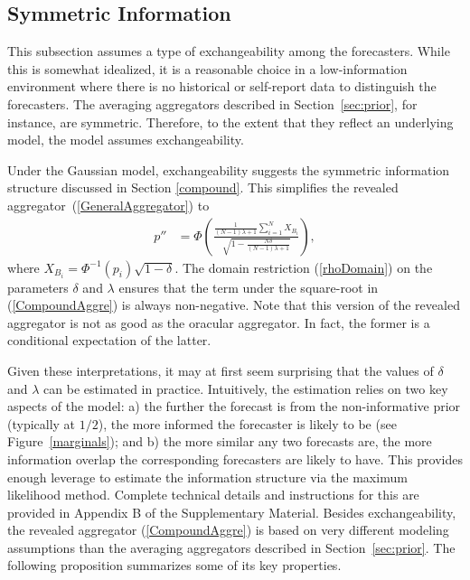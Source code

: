\documentclass[12pt]{article}
\theoremstyle{definition}
\theoremstyle{definition}
\begin{document}
\subsection{Symmetric Information}
\label{compound2}
This subsection assumes a type of exchangeability among the forecasters.
While this is somewhat idealized, it is a reasonable choice in a
low-information environment where there is no historical or
self-report data to distinguish the forecasters.  The averaging
aggregators described in Section~\ref{sec:prior}, for instance, are
symmetric. Therefore, to the extent that they reflect an underlying
model, the model assumes exchangeability. 

Under the Gaussian model, exchangeability suggests the
symmetric information structure discussed in Section \ref{compound}. This simplifies the revealed aggregator~(\ref{GeneralAggregator})  to
\begin{align}
p''
  &=\Phi\left(\frac{\frac{1}{(N-1)\lambda +1} 
  \sum_{i=1}^N X_{B_i} }{\sqrt{1- \frac{N\delta}{(N-1)\lambda +1} }}  
  \right), \label{CompoundAggre}
\end{align}
 where $X_{B_i} =
\Phi^{-1}(p_i)\sqrt{1-\delta}$. 
The domain restriction (\ref{rhoDomain}) on the parameters $\delta$ and $\lambda$ ensures that the term under
the square-root in (\ref{CompoundAggre}) is always non-negative. Note that this version of the revealed aggregator is not as good as the oracular
aggregator. In fact, the former is a conditional expectation of the latter.

Given these interpretations, it may at first seem surprising that the
values of $\delta$ and $\lambda$ can be estimated in practice.
Intuitively, the estimation relies on two key aspects of the model: a)
the further the forecast is from the non-informative prior (typically
at $1/2$), the more informed the forecaster is likely to be (see
Figure~\ref{marginals}); and b) the more similar any two forecasts
are, the more information overlap the corresponding forecasters are
likely to have. This provides enough leverage to estimate the
information structure via the maximum likelihood method.  Complete
technical details and instructions for this are provided in 
Appendix B of the Supplementary Material.  Besides exchangeability, the revealed aggregator
(\ref{CompoundAggre}) is based on very different modeling assumptions
than the averaging aggregators described in
Section~\ref{sec:prior}. The following proposition summarizes some of
its key properties.
\end{document}
